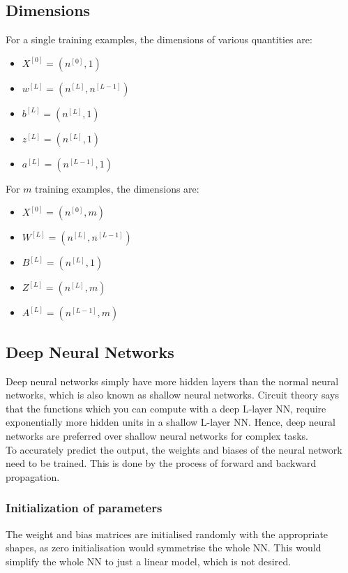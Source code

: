 \documentclass[12pt]{article}
\begin{document}
\begin{itemize}
\begin{center}
        \end{center}
\end{itemize}
\newpage
\subsection*{Dimensions}
For a single training examples, the dimensions of various quantities are:
\begin{itemize}
    \item $X^{[0]} = (n^{[0]},1)$
    \item $w^{[L]} =(n^{[L]},n^{[L-1]})$
    \item $b^{[L]} =(n^{[L]},1)$
    \item $z^{[L]} =(n^{[L]},1)$
    \item $a^{[L]} =(n^{[L-1]},1)$
\end{itemize}
For $m$ training examples, the dimensions are:
\begin{itemize}
    \item $X^{[0]} = (n^{[0]},m)$
    \item $W^{[L]} =(n^{[L]},n^{[L-1]})$
    \item $B^{[L]} =(n^{[L]},1)$
    \item $Z^{[L]} =(n^{[L]},m)$
    \item $A^{[L]} =(n^{[L-1]},m)$
\end{itemize}

\subsection{Deep Neural Networks}
Deep neural networks simply have more hidden layers than the normal neural networks, which is also known as shallow neural networks. Circuit theory says that the functions which you can compute with a deep L-layer NN, require exponentially more hidden units in a shallow L-layer NN. Hence, deep neural networks are preferred over shallow neural networks for complex tasks.\\
To accurately predict the output, the weights and biases of the neural network need to be trained. This is done by the process of forward and backward propagation.
\subsubsection{Initialization of parameters}
The weight and bias matrices are initialised randomly with the appropriate shapes, as zero initialisation would symmetrise the whole NN. This would simplify the whole NN to just a linear model, which is not desired.
\end{document}
